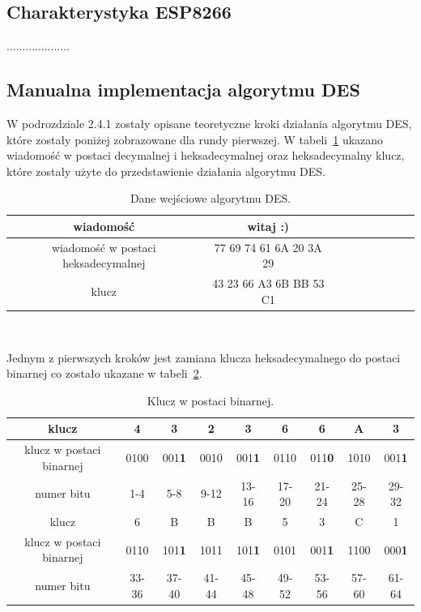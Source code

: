 \documentclass[12p]{article}
\begin{document}
\subsection{Charakterystyka ESP8266}

....................

\subsection{Manualna implementacja algorytmu DES}

\quad W podrozdziale 2.4.1 zostały opisane teoretyczne kroki działania algorytmu DES, które zostały poniżej zobrazowane dla rundy pierwszej. W tabeli~\ref{binary} ukazano wiadomość w postaci decymalnej i heksadecymalnej oraz heksadecymalny klucz, które zostały użyte do przedstawienie działania algorytmu DES. 
 
\begin{table}[H]
\centering
\begin{tabular}{|c|c|c|c|c|c|c|c|c|}
\hline
wiadomość & witaj :)\\
\hline
wiadomość w postaci heksadecymalnej & 77 69 74 61 6A 20 3A 29\\
\hline
klucz & 43 23 66 A3 6B BB 53 C1\\
\hline
\end{tabular}
\caption{Dane wejściowe algorytmu DES.}~\label{binary}
\end{table}

Jednym z pierwszych kroków jest zamiana klucza heksadecymalnego do postaci binarnej co zostało ukazane w tabeli~\ref{klucz_to_binary}.


\begin{table}[H]
\centering
\begin{tabular}{|c|c|c|c|c|c|c|c|c|}
\hline
klucz & 4 & 3 & 2 & 3 & 6 & 6 & A & 3\\
\hline
klucz w postaci binarnej & 0100 & 001\textbf{1} & 0010 & 001\textbf{1} & 0110 & 011\textbf{0} & 1010 & 001\textbf{1}\\ 
\hline
numer bitu & 1-4 & 5-8 & 9-12 & 13-16 & 17-20 & 21-24 & 25-28 & 29-32\\
\hline
\hline
klucz & 6 & B & B & B & 5 & 3 & C & 1\\
\hline
klucz w postaci binarnej & 0110 & 101\textbf{1} & 1011 & 101\textbf{1} & 0101 & 001\textbf{1} & 1100 & 000\textbf{1}\\
\hline
numer bitu & 33-36 & 37-40 & 41-44 & 45-48 & 49-52 & 53-56 & 57-60 & 61-64\\
\hline
\end{tabular}
\caption{Klucz w postaci binarnej.}~\label{klucz_to_binary}
\end{table}
\end{document}
